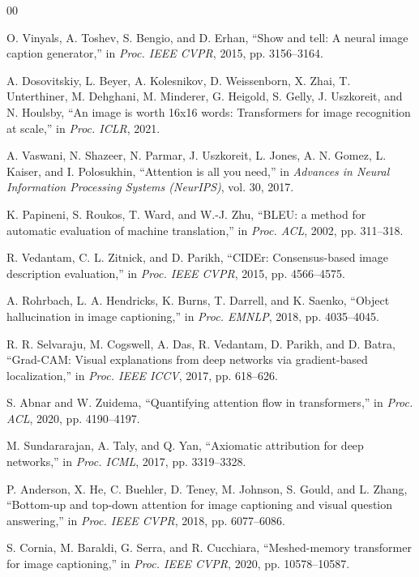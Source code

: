 \documentclass[conference]{IEEEtran}
\begin{document}
\begin{thebibliography}{00}

O. Vinyals, A. Toshev, S. Bengio, and D. Erhan, ``Show and tell: A neural image caption generator,'' in \textit{Proc. IEEE CVPR}, 2015, pp. 3156--3164.

A. Dosovitskiy, L. Beyer, A. Kolesnikov, D. Weissenborn, X. Zhai, T. Unterthiner, M. Dehghani, M. Minderer, G. Heigold, S. Gelly, J. Uszkoreit, and N. Houlsby, ``An image is worth 16x16 words: Transformers for image recognition at scale,'' in \textit{Proc. ICLR}, 2021.

A. Vaswani, N. Shazeer, N. Parmar, J. Uszkoreit, L. Jones, A. N. Gomez, L. Kaiser, and I. Polosukhin, ``Attention is all you need,'' in \textit{Advances in Neural Information Processing Systems (NeurIPS)}, vol. 30, 2017.

K. Papineni, S. Roukos, T. Ward, and W.-J. Zhu, ``BLEU: a method for automatic evaluation of machine translation,'' in \textit{Proc. ACL}, 2002, pp. 311--318.

R. Vedantam, C. L. Zitnick, and D. Parikh, ``CIDEr: Consensus-based image description evaluation,'' in \textit{Proc. IEEE CVPR}, 2015, pp. 4566--4575.

A. Rohrbach, L. A. Hendricks, K. Burns, T. Darrell, and K. Saenko, ``Object hallucination in image captioning,'' in \textit{Proc. EMNLP}, 2018, pp. 4035--4045.

R. R. Selvaraju, M. Cogswell, A. Das, R. Vedantam, D. Parikh, and D. Batra, ``Grad-CAM: Visual explanations from deep networks via gradient-based localization,'' in \textit{Proc. IEEE ICCV}, 2017, pp. 618--626.

S. Abnar and W. Zuidema, ``Quantifying attention flow in transformers,'' in \textit{Proc. ACL}, 2020, pp. 4190--4197.

M. Sundararajan, A. Taly, and Q. Yan, ``Axiomatic attribution for deep networks,'' in \textit{Proc. ICML}, 2017, pp. 3319--3328.

P. Anderson, X. He, C. Buehler, D. Teney, M. Johnson, S. Gould, and L. Zhang, ``Bottom-up and top-down attention for image captioning and visual question answering,'' in \textit{Proc. IEEE CVPR}, 2018, pp. 6077--6086.

S. Cornia, M. Baraldi, G. Serra, and R. Cucchiara, ``Meshed-memory transformer for image captioning,'' in \textit{Proc. IEEE CVPR}, 2020, pp. 10578--10587.


\end{thebibliography}
\end{document}
